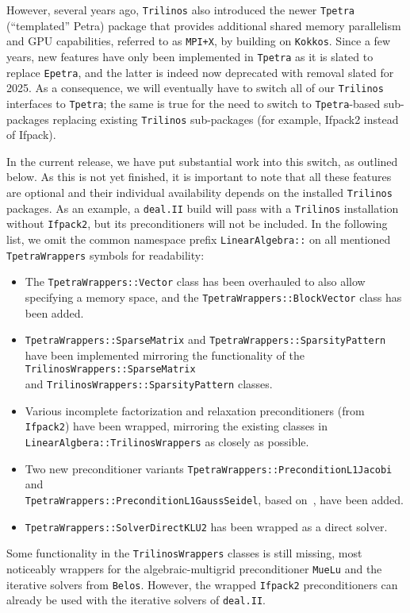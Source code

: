 \documentclass{ansarticle-preprint}
\newcommand{\specialword}[1]{\texttt{#1}}
\newcommand{\dealii}{{\specialword{deal.II}}\xspace}
\newcommand{\trilinos}{{\specialword{Trilinos}}\xspace}
\newcommand{\MPIx}{{\specialword{MPI+X}}\xspace}
\newcommand{\kokkos}{{\specialword{Kokkos}}\xspace}
\newcommand{\epetra}{{\specialword{Epetra}}\xspace}
\newcommand{\tpetra}{{\specialword{Tpetra}}\xspace}
\begin{document}
However, several years ago, \trilinos{} also introduced the
newer \tpetra{} (``templated'' Petra) package that provides additional shared memory
parallelism and GPU capabilities, referred to as \MPIx, by building on \kokkos{}. 
Since a few years, new features have only been implemented in \tpetra{} as 
it is slated to replace \epetra{}, and the latter is indeed
now deprecated with removal slated for 2025. 
As a consequence, 
we will eventually have to switch all of our \trilinos{} interfaces to \tpetra{}; 
the same is true for the need to switch to \tpetra{}-based
sub-packages replacing existing \trilinos{} sub-packages 
(for example, Ifpack2 instead of Ifpack).

In the current release, we have put substantial work into this switch,
as outlined below. As this is not yet finished, it is important to note that 
all these features are optional and their individual availability
depends on the installed \trilinos{} packages. 
As an example, a \dealii{} build will pass with a \trilinos{} installation 
without \texttt{Ifpack2}, but its preconditioners will not be included.
In the following list, we omit the common namespace prefix
\texttt{LinearAlgebra::} on all mentioned
\texttt{TpetraWrappers} symbols for readability:
\begin{itemize}
  \item The \texttt{TpetraWrappers::Vector} class has been overhauled to also allow specifying
    a memory space, and the \texttt{TpetraWrappers::BlockVector} class has been added.
  \item \texttt{TpetraWrappers::SparseMatrix} and \texttt{TpetraWrappers::SparsityPattern} have been implemented mirroring
    the functionality of the \texttt{TrilinosWrappers::SparseMatrix} \\ and \texttt{TrilinosWrappers::SparsityPattern} classes.
  \item Various incomplete factorization and relaxation preconditioners (from \texttt{Ifpack2}) have been wrapped,
    mirroring the existing classes in \texttt{LinearAlgbera::TrilinosWrappers} as closely as possible.
  \item Two new preconditioner variants \texttt{TpetraWrappers::PreconditionL1Jacobi} and \\
    \texttt{TpetraWrappers::PreconditionL1GaussSeidel}, based on~\cite{BFKY2011}, have been added.
  \item \texttt{TpetraWrappers::SolverDirectKLU2} has been wrapped as a direct solver.
\end{itemize}
Some functionality in the \texttt{TrilinosWrappers} classes is still missing, 
most noticeably wrappers for the algebraic-multigrid preconditioner \texttt{MueLu}
and the iterative solvers from \texttt{Belos}.
However, the wrapped \texttt{Ifpack2} preconditioners can already be used with the iterative solvers of \dealii{}.
\end{document}

